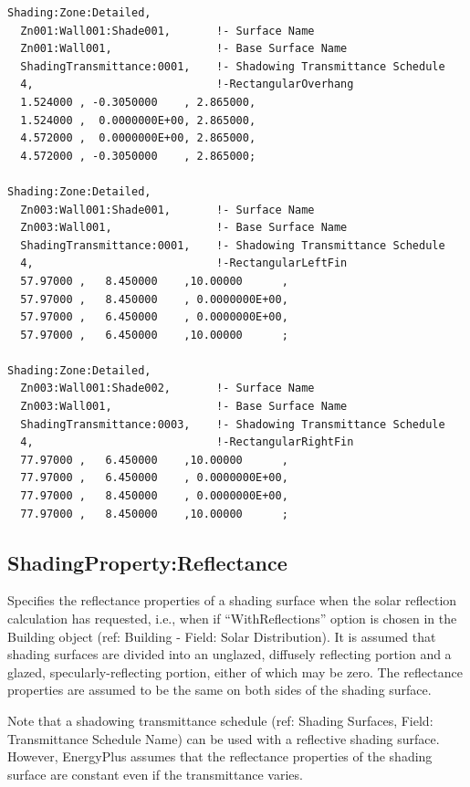 \begin{lstlisting}
Shading:Zone:Detailed,
  Zn001:Wall001:Shade001,       !- Surface Name
  Zn001:Wall001,                !- Base Surface Name
  ShadingTransmittance:0001,    !- Shadowing Transmittance Schedule
  4,                            !-RectangularOverhang
  1.524000 , -0.3050000    , 2.865000,
  1.524000 ,  0.0000000E+00, 2.865000,
  4.572000 ,  0.0000000E+00, 2.865000,
  4.572000 , -0.3050000    , 2.865000;

Shading:Zone:Detailed,
  Zn003:Wall001:Shade001,       !- Surface Name
  Zn003:Wall001,                !- Base Surface Name
  ShadingTransmittance:0001,    !- Shadowing Transmittance Schedule
  4,                            !-RectangularLeftFin
  57.97000 ,   8.450000    ,10.00000      ,
  57.97000 ,   8.450000    , 0.0000000E+00,
  57.97000 ,   6.450000    , 0.0000000E+00,
  57.97000 ,   6.450000    ,10.00000      ;

Shading:Zone:Detailed,
  Zn003:Wall001:Shade002,       !- Surface Name
  Zn003:Wall001,                !- Base Surface Name
  ShadingTransmittance:0003,    !- Shadowing Transmittance Schedule
  4,                            !-RectangularRightFin
  77.97000 ,   6.450000    ,10.00000      ,
  77.97000 ,   6.450000    , 0.0000000E+00,
  77.97000 ,   8.450000    , 0.0000000E+00,
  77.97000 ,   8.450000    ,10.00000      ;
\end{lstlisting}

\subsection{ShadingProperty:Reflectance}\label{shadingpropertyreflectance}

Specifies the reflectance properties of a shading surface when the solar reflection calculation has requested, i.e., when if ``WithReflections'' option is chosen in the Building object (ref: Building - Field: Solar Distribution). It is assumed that shading surfaces are divided into an unglazed, diffusely reflecting portion and a glazed, specularly-reflecting portion, either of which may be zero. The reflectance properties are assumed to be the same on both sides of the shading surface.

Note that a shadowing transmittance schedule (ref: Shading Surfaces, Field: Transmittance Schedule Name) can be used with a reflective shading surface. However, EnergyPlus assumes that the reflectance properties of the shading surface are constant even if the transmittance varies.

